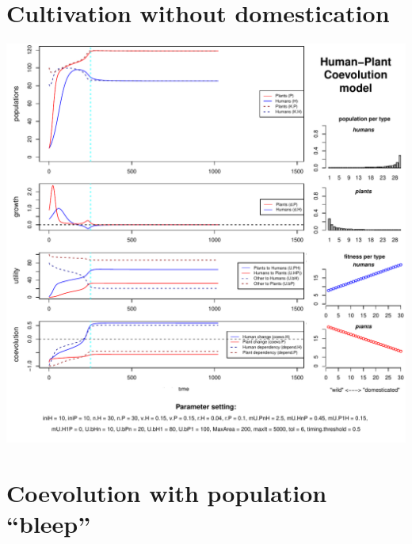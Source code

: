 \documentclass[
]{book}
\begin{document}
\newpage

\hypertarget{cultivation-without-domestication}{%
\section{Cultivation without domestication}\label{cultivation-without-domestication}}

\includegraphics{hpcModel-exploration_files/figure-latex/1_run.cult.without.dom-plot-1.pdf}

\newpage

\hypertarget{coevolution-with-population-bleep}{%
\section{Coevolution with population ``bleep''}\label{coevolution-with-population-bleep}}
\end{document}
